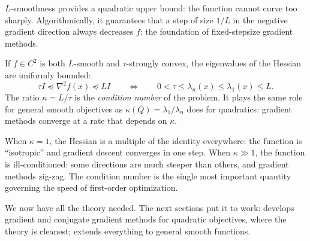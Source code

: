 $L$-smoothness provides a quadratic upper bound: the function cannot curve too sharply.
Algorithmically, it guarantees that a step of size $1/L$ in the negative gradient direction always decreases $f$: the foundation of fixed-stepsize gradient methods.

\begin{theorem}\label{thm:hessian-bounds}
	If $f \in C^2$ is both $L$-smooth and $\tau$-strongly convex, the eigenvalues of the Hessian are uniformly bounded:
	\begin{equation}\label{eq:hessian-bounds}
		\tau I \preceq \nabla^2 f(x) \preceq LI
		\qquad \Longleftrightarrow \qquad
		0 < \tau \leq \lambda_n(x) \leq \lambda_1(x) \leq L.
	\end{equation}
	The ratio $\kappa = L / \tau$ is the \emph{condition number} of the problem.
	It plays the same role for general smooth objectives as $\kappa(Q) = \lambda_1 / \lambda_n$ does for quadratics: gradient methods converge at a rate that depends on $\kappa$.
\end{theorem}

When $\kappa = 1$, the Hessian is a multiple of the identity everywhere: the function is ``isotropic'' and gradient descent converges in one step.
When $\kappa \gg 1$, the function is ill-conditioned: some directions are much steeper than others, and gradient methods zig-zag.
The condition number is the single most important quantity governing the speed of first-order optimization.

We now have all the theory needed.
The next sections put it to work:  develops gradient and conjugate gradient methods for quadratic objectives, where the theory is cleanest;  extends everything to general smooth functions.